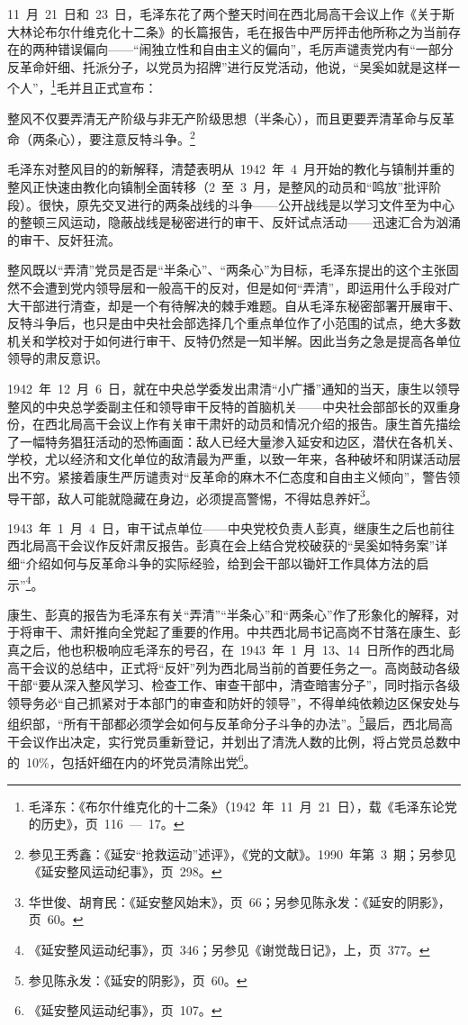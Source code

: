 11~月~21~日和~23~日，毛泽东花了两个整天时间在西北局高干会议上作《关于斯大林论布尔什维克化十二条》的长篇报告，毛在报告中严厉抨击他所称之为当前存在的两种错误偏向——“闹独立性和自由主义的偏向”，毛厉声谴责党内有“一部分反革命奸细、托派分子，以党员为招牌”进行反党活动，他说，“吴奚如就是这样一个人”，\footnote{毛泽东：《布尔什维克化的十二条》（1942~年~11~月~21~日），载《毛泽东论党的历史》，页~116~—~17。}毛并且正式宣布：

\begin{quoting}
整风不仅要弄清无产阶级与非无产阶级思想（半条心），而且更要弄清革命与反革命（两条心），要注意反特斗争。\footnote{参见王秀鑫：《延安“抢救运动”述评》，《党的文献》。1990~年第~3~期；另参见《延安整风运动纪事》，页~298。}
\end{quoting}

毛泽东对整风目的的新解释，清楚表明从~1942~年~4~月开始的教化与镇制并重的整风正快速由教化向镇制全面转移（2~至~3~月，是整风的动员和“鸣放”批评阶段）。很快，原先交叉进行的两条战线的斗争——公开战线是以学习文件至为中心的整顿三风运动，隐蔽战线是秘密进行的审干、反奸试点活动——迅速汇合为汹涌的审干、反奸狂流。

整风既以“弄清”党员是否是“半条心”、“两条心”为目标，毛泽东提出的这个主张固然不会遭到党内领导层和一般高干的反对，但是如何“弄清”，即运用什么手段对广大干部进行清查，却是一个有待解决的棘手难题。自从毛泽东秘密部署开展审干、反特斗争后，也只是由中央社会部选择几个重点单位作了小范围的试点，绝大多数机关和学校对于如何进行审干、反特仍然是一知半解。因此当务之急是提高各单位领导的肃反意识。

1942~年~12~月~6~日，就在中央总学委发出肃清“小广播”通知的当天，康生以领导整风的中央总学委副主任和领导审干反特的首脑机关——中央社会部部长的双重身份，在西北局高干会议上作有关审干肃奸的动员和情况介绍的报告。康生首先描绘了一幅特务猖狂活动的恐怖画面：敌人已经大量渗入延安和边区，潜伏在各机关、学校，尤以经济和文化单位的敌清最为严重，以致一年来，各种破坏和阴谋活动层出不穷。紧接着康生严厉谴责对“反革命的麻木不仁态度和自由主义倾向”，警告领导干部，敌人可能就隐藏在身边，必须提高警惕，不得姑息养奸\footnote{华世俊、胡育民：《延安整风始末》，页~66；另参见陈永发：《延安的阴影》，页~60。}。

1943~年~1~月~4~日，审干试点单位——中央党校负责人彭真，继康生之后也前往西北局高干会议作反奸肃反报告。彭真在会上结合党校破获的“吴奚如特务案”详细“介绍如何与反革命斗争的实际经验，给到会干部以锄奸工作具体方法的启示”\footnote{《延安整风运动纪事》，页~346；另参见《谢觉哉日记》，上，页~377。}。

康生、彭真的报告为毛泽东有关“弄清”“半条心”和“两条心”作了形象化的解释，对于将审干、肃奸推向全党起了重要的作用。中共西北局书记高岗不甘落在康生、彭真之后，他也积极响应毛泽东的号召，在~1943~年~1~月~13、14~日所作的西北局高干会议的总结中，正式将“反奸”列为西北局当前的首要任务之一。高岗鼓动各级干部“要从深入整风学习、检查工作、审查干部中，清查暗害分子”，同时指示各级领导务必“自己抓紧对于本部门的审查和防奸的领导”，不得单纯依赖边区保安处与组织部，“所有干部都必须学会如何与反革命分子斗争的办法”。\footnote{参见陈永发：《延安的阴影》，页~60。}最后，西北局高干会议作出决定，实行党员重新登记，并划出了清洗人数的比例，将占党员总数中的~10\%，包括奸细在内的坏党员清除出党\footnote{《延安整风运动纪事》，页~107。}。

